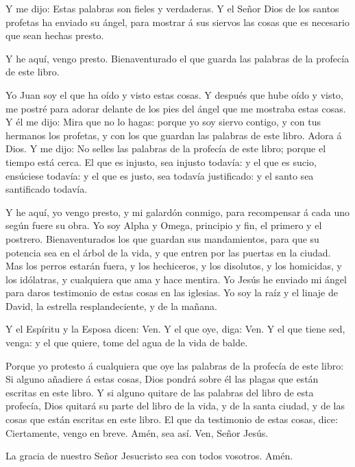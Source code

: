  Y me dijo: Estas palabras son fieles y verdaderas. Y el
Señor Dios de los santos profetas ha enviado su ángel, para mostrar á
sus siervos las cosas que es necesario que sean hechas presto.

 Y he aquí, vengo presto. Bienaventurado el que guarda las
palabras de la profecía de este libro.

 Yo Juan soy el que ha oído y visto estas cosas. Y después
que hube oído y visto, me postré para adorar delante de los pies del
ángel que me mostraba estas cosas.  Y él me dijo: Mira que
no lo hagas: porque yo soy siervo contigo, y con tus hermanos los
profetas, y con los que guardan las palabras de este libro. Adora á
Dios.  Y me dijo: No selles las palabras de la profecía de
este libro; porque el tiempo está cerca.  El que es
injusto, sea injusto todavía: y el que es sucio, ensúciese todavía: y el
que es justo, sea todavía justificado: y el santo sea santificado
todavía.

 Y he aquí, yo vengo presto, y mi galardón conmigo, para
recompensar á cada uno según fuere su obra.  Yo soy Alpha y
Omega, principio y fin, el primero y el postrero. 
Bienaventurados los que guardan sus mandamientos, para que su potencia
sea en el árbol de la vida, y que entren por las puertas en la ciudad.
 Mas los perros estarán fuera, y los hechiceros, y los
disolutos, y los homicidas, y los idólatras, y cualquiera que ama y hace
mentira.  Yo Jesús he enviado mi ángel para daros
testimonio de estas cosas en las iglesias. Yo soy la raíz y el linaje de
David, la estrella resplandeciente, y de la mañana.

 Y el Espíritu y la Esposa dicen: Ven. Y el que oye, diga:
Ven. Y el que tiene sed, venga: y el que quiere, tome del agua de la
vida de balde.

 Porque yo protesto á cualquiera que oye las palabras de la
profecía de este libro: Si alguno añadiere á estas cosas, Dios pondrá
sobre él las plagas que están escritas en este libro.  Y si
alguno quitare de las palabras del libro de esta profecía, Dios quitará
su parte del libro de la vida, y de la santa ciudad, y de las cosas que
están escritas en este libro.  El que da testimonio de
estas cosas, dice: Ciertamente, vengo en breve. Amén, sea así. Ven,
Señor Jesús.

 La gracia de nuestro Señor Jesucristo sea con todos
vosotros. Amén.
